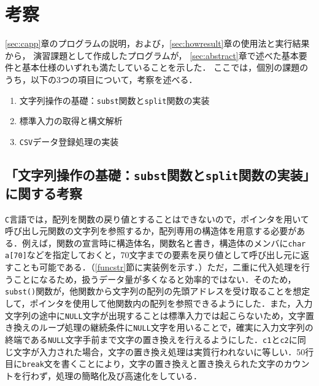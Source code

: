 \section{考察}

\ref{sec:capp}章のプログラムの説明，および，\ref{sec:howresult}章の使用法と実行結果から，
演習課題として作成したプログラムが，
\ref{sec:abstract}章で述べた基本要件と基本仕様のいずれも満たしていることを示した．
ここでは，個別の課題のうち，以下の3つの項目について，考察を述べる．

\begin{enumerate}
\setlength{\parskip}{2pt} \setlength{\itemsep}{2pt}
    \item 文字列操作の基礎：\texttt{subst}関数と\texttt{split}関数の実装
    \item 標準入力の取得と構文解析
    \item \texttt{CSV}データ登録処理の実装
\end{enumerate}

\subsection{「文字列操作の基礎：\texttt{subst}関数と\texttt{split}関数の実装」に関する考察}

\verb|C|言語では，配列を関数の戻り値とすることはできないので，ポインタを用いて呼び出し元関数の文字列を参照するか，配列専用の構造体を用意する必要がある．例えば，関数の宣言時に構造体名，関数名と書き，構造体のメンバに\verb|char a[70]|などを指定しておくと，70文字までの要素を戻り値として呼び出し元に返すことも可能である．（\ref{funcstr}節に実装例を示す．）ただ，二重に代入処理を行うことになるため，扱うデータ量が多くなると効率的ではない．そのため，\verb|subst()|関数が，他関数から文字列の配列の先頭アドレスを受け取ることを想定して，ポインタを使用して他関数内の配列を参照できるようにした．また，入力文字列の途中に\verb|NULL|文字が出現することは標準入力では起こらないため，文字置き換えのループ処理の継続条件に\verb|NULL|文字を用いることで，確実に入力文字列の終端である\verb|NULL|文字手前まで文字の置き換えを行えるようにした．\verb|c1|と\verb|c2|に同じ文字が入力された場合，文字の置き換え処理は実質行われないに等しい．50行目に\verb|break|文を書くことにより，文字の置き換えと置き換えられた文字のカウントを行わず，処理の簡略化及び高速化をしている．


